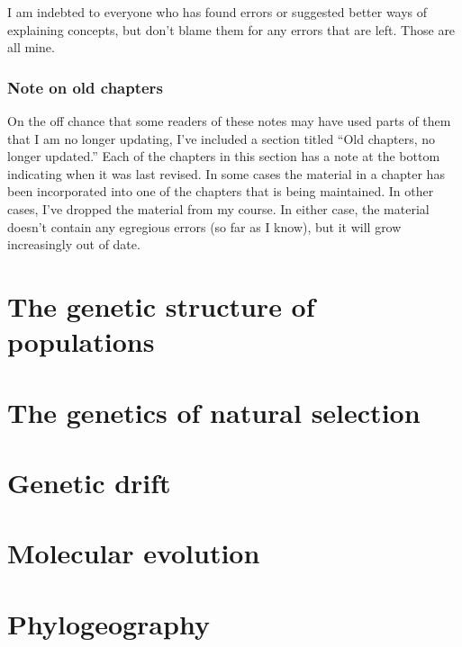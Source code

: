 \documentclass[12pt,titlepage,openright]{book}
\begin{document}
I am indebted to everyone who has found errors or suggested better
ways of explaining concepts, but don't blame them for any errors that
are left. Those are all mine.

\section*{Note on old chapters}

On the off chance that some readers of these notes may have used parts
of them that I am no longer updating, I've included a section titled
``Old chapters, no longer updated.'' Each of the chapters in this
section has a note at the bottom indicating when it was last
revised. In some cases the material in a chapter has been incorporated
into one of the chapters that is being maintained. In other cases,
I've dropped the material from my course. In either case, the material
doesn't contain any egregious errors (so far as I know), but it will
grow increasingly out of date.

\newpage
{}
\part{The genetic structure of populations}








\part{The genetics of natural selection}




\part{Genetic drift}






\part{Molecular evolution}





\part{Phylogeography}
\end{document}
